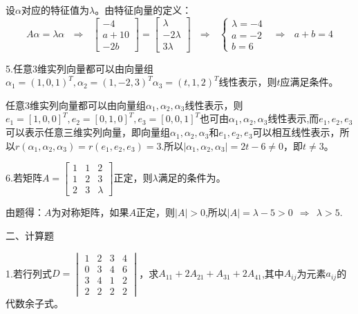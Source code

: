 \documentclass{article}
\begin{document}
\begin{jie}
设$\alpha$对应的特征值为$\lambda$。由特征向量的定义：
\begin{equation*}
A\alpha=\lambda\alpha~~~\Rightarrow~~~
\begin{bmatrix}
-4 \\ a+10 \\ -2b
\end{bmatrix}=
\begin{bmatrix}
\lambda \\ -2\lambda \\ 3\lambda
\end{bmatrix}~~~\Rightarrow ~~~
\begin{cases}
\lambda=-4\\
a=-2\\
b=6
\end{cases}~~~\Rightarrow~~~a+b=4
\end{equation*}
\end{jie}

5.任意3维实列向量都可以由向量组$\alpha_{1}=(1,0,1)^{T},\alpha_{2}=(1,-2,3)^{T}\alpha_{3}=(t,1,2)^{T}$线性表示，则$t$应满足条件\underline{\hphantom{~~~~~~~~~~}}。

\begin{jie}
任意3维实列向量都可以由向量组$\alpha_{1},\alpha_{2},\alpha_{3}$线性表示，则$e_{1}=[1,0,0]^T,e_2=[0,1,0]^T,e_3=[0,0,1]^T$也可由$\alpha_ {1},\alpha_{2},\alpha_{3}$线性表示,而$e_1,e_2,e_3$可以表示任意三维实列向量，即向量组$\alpha_ {1},\alpha_{2},\alpha_{3}$和$e_1,e_2,e_3$可以相互线性表示，所以$r(\alpha_ {1},\alpha_{2},\alpha_{3})=r(e_1,e_2,e_3)=3$.所以$|\alpha_ {1},\alpha_{2},\alpha_{3}|=2t-6\neq0$，即$t\neq3$。
\end{jie}

6.若矩阵$
A=
\begin{bmatrix}
  1 & 1 & 2 \\
  1 & 2 & 3\\
  2 & 3 & \lambda
\end{bmatrix}
$正定，则$\lambda$满足的条件为\underline{\hphantom{~~~~~~~~~~}}。

\begin{jie}
由题得：$A$为对称矩阵，如果$A$正定，则$|A|>0$,所以$|A|=\lambda-5>0~~\Rightarrow~~\lambda>5$.
\end{jie}

二、计算题

1.若行列式$D=
\begin{vmatrix}
  1 & 2 & 3 & 4 \\
  0 & 3 & 4 & 6 \\
  3 & 4 & 1 & 2 \\
  2 & 2 & 2 & 2
\end{vmatrix}
$，求$A_{11}+2A_{21}+A_{31}+2A_{41}$,其中$A_{ij}$为元素$a_{ij}$的代数余子式。
\end{document}
